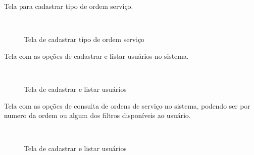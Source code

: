 Tela para cadastrar tipo de ordem serviço.

\begin{figure}[H]
		\caption{\label{Cadastro_Tipo_Ordem} Tela de cadastrar tipo de ordem serviço}
	\centering
	\mbox{%
		\qquad
	}
	
\end{figure}
\newpage


Tela com as opções de cadastrar e listar usuários no sistema.

\begin{figure}[H]
		\caption{\label{listagem_e_cadastro_de_usuario} Tela de cadastrar e listar usuários}
	\centering
	\mbox{%
		\qquad
	}
	
\end{figure}
\newpage

Tela com as opções de consulta de ordens de serviço no sistema, podendo ser por numero da ordem ou algum dos filtros disponíveis ao usuário.

\begin{figure}[H]
		\caption{\label{Consulta_ordem} Tela de cadastrar e listar usuários}
	\centering
	\mbox{%
		\qquad
	}
	
\end{figure}
\newpage
